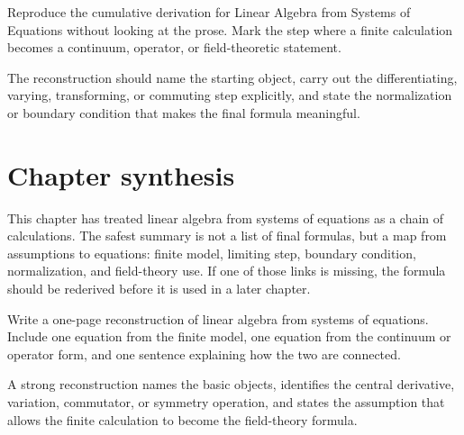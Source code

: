 \begin{exercise}
Reproduce the cumulative derivation for Linear Algebra from Systems of Equations without looking at the prose.  Mark the step where a finite calculation becomes a continuum, operator, or field-theoretic statement.
\begin{answer}
The reconstruction should name the starting object, carry out the differentiating, varying, transforming, or commuting step explicitly, and state the normalization or boundary condition that makes the final formula meaningful.
\end{answer}
\end{exercise}



\section{Chapter synthesis}

This chapter has treated linear algebra from systems of equations as a chain of calculations.  The safest summary is not a list of final formulas, but a map from assumptions to equations: finite model, limiting step, boundary condition, normalization, and field-theory use.  If one of those links is missing, the formula should be rederived before it is used in a later chapter.

\begin{exercise}
Write a one-page reconstruction of linear algebra from systems of equations.  Include one equation from the finite model, one equation from the continuum or operator form, and one sentence explaining how the two are connected.
\begin{answer}
A strong reconstruction names the basic objects, identifies the central derivative, variation, commutator, or symmetry operation, and states the assumption that allows the finite calculation to become the field-theory formula.
\end{answer}
\end{exercise}
